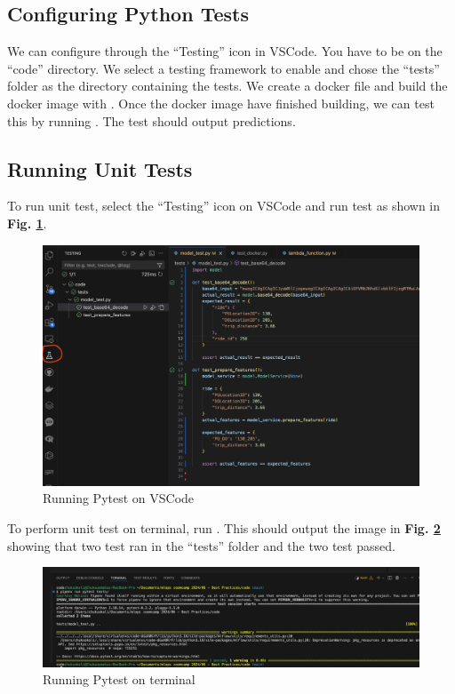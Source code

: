 \documentclass[letterpaper,12pt,notitlepage,twoside]{report}
\begin{document}
\subsection*{Configuring Python Tests}
We can configure through the ``Testing'' icon in VSCode. You have to be on the ``code'' directory. We select a testing framework to enable and chose the ``tests'' folder as the directory containing the tests. We create a docker file and build the docker image with . Once the docker image have finished building, we can test this by running . The test should output predictions. 

\subsection*{Running Unit Tests}
To run unit test, select the ``Testing'' icon on VSCode and run test as shown in \textbf{Fig. \ref{fig:16}}.
\begin{figure}[h]
	\centering
	\includegraphics[width=\textwidth]{Images/unit-test-on-vscode.png}
	\caption{Running Pytest on VSCode}
	\label{fig:16}
\end{figure}
\FloatBarrier

To perform unit test on terminal, run . This should output the image in \textbf{Fig. \ref{fig:17}} showing that two test ran in the ``tests'' folder and the two test passed.

\begin{figure}[h]
	\centering
	\includegraphics[width=\textwidth]{Images/unit-test-on-terminal.png}
	\caption{Running Pytest on terminal}
	\label{fig:17}
\end{figure}
\FloatBarrier
\end{document}
